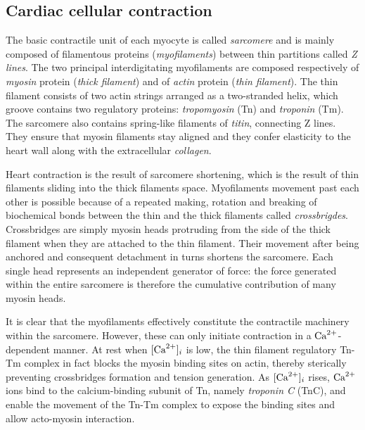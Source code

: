 %
%
%
\subsection{Cardiac cellular contraction}\label{sec:cardiaccellcontr}
The basic contractile unit of each myocyte is called \textit{sarcomere} and is mainly composed of filamentous proteins (\textit{myofilaments}) between thin partitions called \textit{Z lines}. The two principal interdigitating myofilaments are composed respectively of \textit{myosin} protein (\textit{thick filament}) and of \textit{actin} protein (\textit{thin filament}). The thin filament consists of two actin strings arranged as a two-stranded helix, which groove contains two regulatory proteins: \textit{tropomyosin} (\acs{Tn}) and \textit{troponin} (\acs{Tm}). The sarcomere also contains spring-like filaments of \textit{titin}, connecting Z lines. They ensure that myosin filaments stay aligned and they confer elasticity to the heart wall along with the extracellular \textit{collagen}. 

\vspace{0.2cm}
Heart contraction is the result of sarcomere shortening, which is the result of thin filaments sliding into the thick filaments space. Myofilaments movement past each other is possible because of a repeated making, rotation and breaking of biochemical bonds between the thin and the thick filaments called \textit{crossbrigdes}. Crossbridges are simply myosin heads protruding from the side of the thick filament when they are attached to the thin filament. Their movement after being anchored and consequent detachment in turns shortens the sarcomere. Each single head represents an independent generator of force: the force generated within the entire sarcomere is therefore the cumulative contribution of many myosin heads.

\vspace{0.2cm}
It is clear that the myofilaments effectively constitute the contractile machinery within the sarcomere. However, these can only initiate contraction in a $\textrm{Ca}^{2+}$-dependent manner. At rest when $[\textrm{Ca}^{2+}]_{i}$ is low, the thin filament regulatory Tn-Tm complex in fact blocks the myosin binding sites on actin, thereby sterically preventing crossbridges formation and tension generation. As $[\textrm{Ca}^{2+}]_{i}$ rises, $\textrm{Ca}^{2+}$ ions bind to the calcium-binding subunit of Tn, namely \textit{troponin C} (\acs{TnC}), and enable the movement of the Tn-Tm complex to expose the binding sites and allow acto-myosin interaction.



